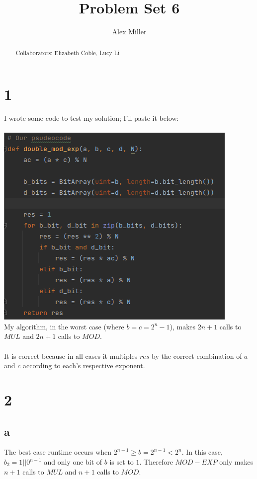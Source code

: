 \documentclass[]{article}
\title{Problem Set 6}
\author{Alex Miller}
\begin{document}
\maketitle

\begin{abstract}
	Collaborators: Elizabeth Coble, Lucy Li
\end{abstract}

\section{1}
I wrote some code to test my solution; I'll paste it below:
\\\\
\includegraphics[scale=0.5]{p1_code.png}\\
My algorithm, in the worst case (where $b = c = 2^{n} - 1$), makes $2n + 1$ calls to $MUL$ and $2n + 1$ calls to $MOD$.
\\\\
It is correct because in all cases it multiples $res$ by the correct combination of $a$ and $c$ according to each's respective exponent.
\section{2}
\subsection{a}
The best case runtime occurs when $2^{n - 1} \geq b = 2^{n - 1} < 2^{n}$. In this case, $b_2 = 1 || 0^{n-1}$ and only one bit of $b$ is set to $1$. Therefore $MOD-EXP$ only makes $n + 1$ calls to $MUL$ and $n + 1$ calls to $MOD$.
\end{document}
